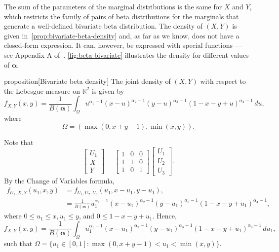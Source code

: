 \documentclass[a4paper, notitlepage, 10pt]{article}
\newcommand{\R}{\mathbb{R}}
\theoremstyle{definition}
\begin{document}
The sum of the parameters of the marginal distributions is the same for $X$ and $Y$, which restricts the family of pairs of beta distributions for the marginals that generate a well-defined bivariate beta distribution.
The density of $(X, Y)$ is given in~\autoref{prop:bivariate-beta-density} and, as far as we know, does not have a closed-form expression.
It can, however, be expressed with special functions --- see Appendix A of~\cite{olkin2015constructions}.
\autoref{fig:beta-bivariate} illustrates the density for different values of $\boldsymbol{\alpha}$.

\begin{theoremEnd}{proposition}[Bivariate beta density]\label{prop:bivariate-beta-density}
  The joint density of $(X, Y)$ with respect to the Lebesgue measure on $\R^2$ is given by 
  \begin{equation}
    \label{eq:dist-X-Y}
    f_{X,Y}(x,y) = \frac{1}{B(\boldsymbol{\alpha})}\int_{\Omega} u^{\alpha_1 - 1}{(x - u)}^{\alpha_2 -1}{(y-u)}^{\alpha_3-1}{(1-x-y+u)}^{\alpha_4-1} \, du,
  \end{equation}
  where 
  \[
  \Omega = (\max(0, x+y-1), \min(x,y)).
  \]
\end{theoremEnd}

\begin{proofEnd}
   Note that
   \[
  \begin{bmatrix}
    U_1 \\ X \\ Y
  \end{bmatrix}  = \begin{bmatrix}
    1 & 0 & 0 \\
    1 & 1 & 0 \\
    1 & 0 & 1
  \end{bmatrix}\begin{bmatrix}
    U_1 \\ U_2 \\ U_3
  \end{bmatrix}.
  \]
  By the Change of Variables formula, 
  \begin{equation}
    \begin{split}
      f_{U_1,X,Y}(u_1,x,y) &= f_{U_1,U_2,U_3}(u_1, x - u_1, y - u_1), \\ 
      &= \frac{1}{B(\boldsymbol{\alpha})}u_1^{\alpha_1-1}{(x-u_1)}^{\alpha_2-1}{(y-u_1)}^{\alpha_3-1}{(1-x-y+u_1)}^{\alpha_4-1},
    \end{split}
  \end{equation}
  where $0 \le u_1 \le x, u_1 \le y$, and $0 \le 1 - x - y + u_1$.  
  Hence,
  \begin{equation}
      f_{X,Y}(x,y) = \frac{1}{B(\boldsymbol{\alpha})}\int_{\Omega} u_1^{\alpha_1-1}{(x-u_1)}^{\alpha_2-1}{(y-u_1)}^{\alpha_3-1}{(1-x-y+u_1)}^{\alpha_4-1} \, du_1,
  \end{equation}
  such that $\Omega = \{u_1 \in [0,1] : \max(0, x + y -1) < u_1 < \min(x,y)\}$.
\end{proofEnd} 
\end{document}
